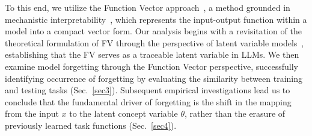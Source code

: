 
To this end, we utilize the Function Vector approach~\citep{todd2023function}, a method grounded in mechanistic interpretability~\citep{wang2023interpretability, bills2023language}, which represents the input-output function within a model into a compact vector form. Our analysis begins with a revisitation of the theoretical formulation of FV through the perspective of latent variable models~\citep{baum1966statistical, gruber2007hidden}, establishing that the FV serves as a traceable latent variable in LLMs. We then examine model forgetting through the Function Vector perspective, successfully identifying occurrence of forgetting by evaluating the similarity between training and testing tasks (Sec.~\ref{sec3}). Subsequent empirical investigations lead us to conclude that the fundamental driver of forgetting is the shift in the mapping from the input \(x\) to the latent concept variable \(\theta\), rather than the erasure of previously learned task functions (Sec.~\ref{sec4}).




